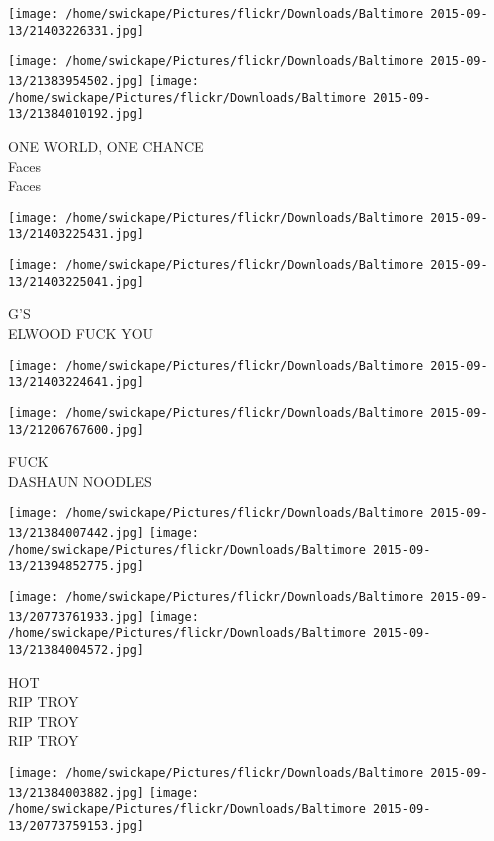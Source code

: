 \documentclass[10pt,letterpaper]{article}
\begin{document}
\texttt{[image: /home/swickape/Pictures/flickr/Downloads/Baltimore 2015-09-13/21403226331.jpg]}

\vspace{0.25in}
\texttt{[image: /home/swickape/Pictures/flickr/Downloads/Baltimore 2015-09-13/21383954502.jpg]}
\texttt{[image: /home/swickape/Pictures/flickr/Downloads/Baltimore 2015-09-13/21384010192.jpg]}

ONE WORLD, ONE CHANCE\\
Faces\\
Faces\\
\pagebreak

\texttt{[image: /home/swickape/Pictures/flickr/Downloads/Baltimore 2015-09-13/21403225431.jpg]}

\vspace{0.25in}
\texttt{[image: /home/swickape/Pictures/flickr/Downloads/Baltimore 2015-09-13/21403225041.jpg]}

G'S\\
ELWOOD FUCK YOU\\
\pagebreak

\texttt{[image: /home/swickape/Pictures/flickr/Downloads/Baltimore 2015-09-13/21403224641.jpg]}

\vspace{0.25in}
\texttt{[image: /home/swickape/Pictures/flickr/Downloads/Baltimore 2015-09-13/21206767600.jpg]}

FUCK\\
DASHAUN NOODLES\\
\pagebreak

\texttt{[image: /home/swickape/Pictures/flickr/Downloads/Baltimore 2015-09-13/21384007442.jpg]}
\texttt{[image: /home/swickape/Pictures/flickr/Downloads/Baltimore 2015-09-13/21394852775.jpg]}

\texttt{[image: /home/swickape/Pictures/flickr/Downloads/Baltimore 2015-09-13/20773761933.jpg]}
\texttt{[image: /home/swickape/Pictures/flickr/Downloads/Baltimore 2015-09-13/21384004572.jpg]}

HOT\\
RIP TROY\\
RIP TROY\\
RIP TROY\\
\pagebreak

\texttt{[image: /home/swickape/Pictures/flickr/Downloads/Baltimore 2015-09-13/21384003882.jpg]}
\texttt{[image: /home/swickape/Pictures/flickr/Downloads/Baltimore 2015-09-13/20773759153.jpg]}
\end{document}
